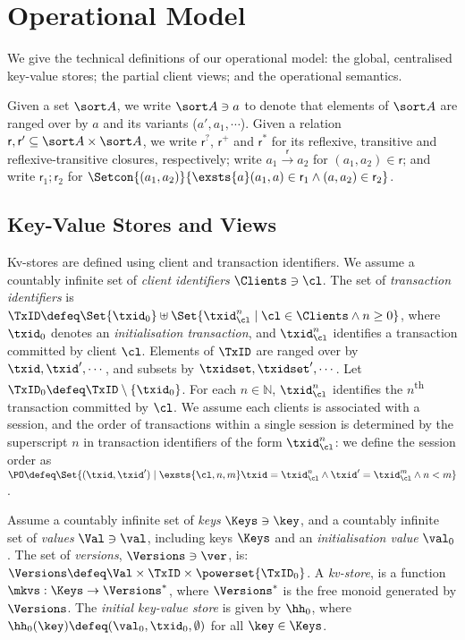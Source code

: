\section{Operational Model}
\label{sec:model}

We give the technical definitions of our operational model: 
the global, centralised key-value stores; the partial client views;  and the
operational semantics. 

Given a set $\sort A$, we write $\sort A \ni a$ to denote that elements of $\sort A$ are ranged over by $a$ and its variants (\eg $a', a_1, \cdots$). 
Given a relation $\mathsf r, \mathsf r' \subseteq \sort A \times \sort A$,
we write $\mathsf r^?$, $\mathsf r^+$ and $\mathsf r^*$ for its reflexive, transitive and reflexive-transitive closures, respectively;
write $a_1 \xrightarrow{\mathsf r} a_2$ for $(a_1, a_2) \in \mathsf r$;
and write \( \mathsf r_1 ; \mathsf r_2\) for \( \Setcon{(a_1,a_2)}{\exsts{a} (a_1,a) \in \mathsf r_1 \land (a,a_2) \in \mathsf r_2}\).

\subsection{Key-Value Stores and Views}
\label{subsec:kvstores}
\label{sec:mkvs-view}
Kv-stores are defined using client and transaction identifiers.
We assume a countably infinite set of \emph{client identifiers} $\Clients \ni \cl$. 
The set of \emph{transaction identifiers} is  
$\TxID \defeq  \Set{\txid_{0}} \uplus \Set{ \txid_{\cl}^{n} \mid \cl
  \in \Clients \wedge n \geq 0 }$, 
where  $\txid_0$ denotes  an \emph{initialisation transaction}, 
and $\txid_{\cl}^{n}$ identifies a transaction committed by client $\cl$. 
Elements of $\TxID$ are ranged over by
$\txid, \txid', \cdots$, and subsets by $\txidset, \txidset', \cdots$. 
Let $\TxID_{0} \defeq \TxID \setminus \{ \txid_0\}$. 
For each $n \in \mathbb{N}$, $\txid_{\cl}^{n}$ identifies the $n$\textsuperscript{th} transaction  committed by $\cl$.
We assume each clients is associated with a session, 
and the order of transactions within a single session is determined by the superscript 
$n$ in transaction identifiers of the form $\txid_{\cl}^{n}$: we define the session order 
as 
$\PO \defeq \Set{ (\txid, \txid') \mid \exsts{ \cl, n,m } \txid =
  \txid_{\cl}^{n} \wedge \txid' = \txid_{\cl}^{m} \wedge n < m}$.

\begin{definition}[Kv-stores]
\label{def:his_heap}
\label{def:mkvs}
Assume a countably infinite set of \emph{keys} $\Keys \ni \key$, 
and a countably infinite set of  \emph{values} $\Val \ni \val$, 
including keys \( \Keys \) and an \emph{initialisation value} $\val_0$.
The set of \emph{versions}, $\Versions \ni \ver$, is: $\Versions \defeq \Val \times \TxID \times \powerset{\TxID_{0}}$. 
A \emph{kv-store}, 
is a function $\mkvs: \Keys \rightarrow \Versions^{\ast}$, 
where $\Versions^{\ast}$ is the free monoid generated by $\Versions$. 
The \emph{initial key-value store} is given by $\hh_0$, where 
$\hh_{0}(\key)\defeq  (\val_0, \txid_0, \emptyset)$ for
all $\key \in \Keys$.
\end{definition}

